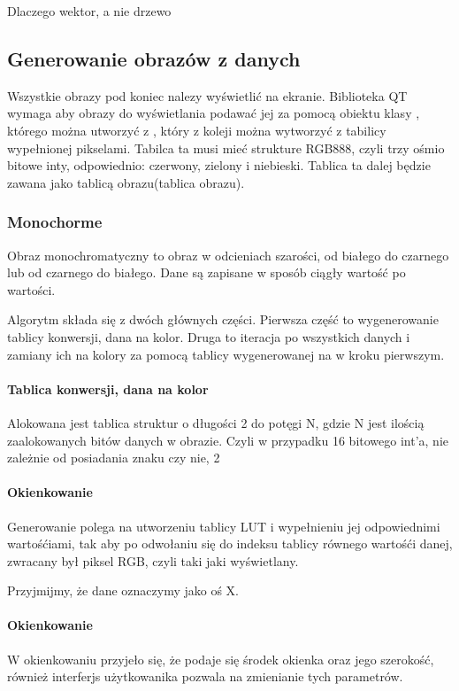 Dlaczego wektor, a nie drzewo

\subsection{Generowanie obrazów z danych}

Wszystkie obrazy pod koniec nalezy wyświetlić na ekranie. 
Biblioteka QT wymaga aby obrazy do wyświetlania podawać jej za pomocą obiektu klasy , którego można utworzyć z , który z koleji można wytworzyć z tabilicy wypełnionej pikselami.
Tabilca ta musi mieć strukture RGB888, czyli trzy ośmio bitowe inty, odpowiednio: czerwony, zielony i niebieski.
Tablica ta dalej będzie zawana jako tablicą obrazu(tablica obrazu).

\subsubsection{Monochorme}

Obraz monochromatyczny to obraz w odcieniach szarości, od białego do czarnego lub od czarnego do białego. Dane są zapisane w sposób ciągły wartość po wartości.


Algorytm składa się z dwóch głównych części.
Pierwsza część to wygenerowanie tablicy konwersji, dana na kolor.
Druga to iteracja po wszystkich danych i zamiany ich na kolory za pomocą tablicy wygenerowanej na w kroku pierwszym.


\paragraph{Tablica konwersji, dana na kolor}

Alokowana jest tablica struktur  o długości 2 do potęgi N, gdzie N jest ilością zaalokowanych bitów danych w obrazie.
Czyli w przypadku 16 bitowego int'a, nie zależnie od posiadania znaku czy nie, 2

\paragraph{Okienkowanie}

Generowanie polega na utworzeniu tablicy LUT i wypełnieniu jej odpowiednimi wartośćiami, tak aby po odwołaniu się do indeksu tablicy równego wartośći danej, zwracany był piksel RGB, czyli taki jaki wyświetlany.

Przyjmijmy, że dane oznaczymy jako oś X.


\paragraph{Okienkowanie}
W okienkowaniu przyjeło się, że podaje się środek okienka oraz jego szerokość, również interferjs użytkowanika pozwala na zmienianie tych parametrów.



